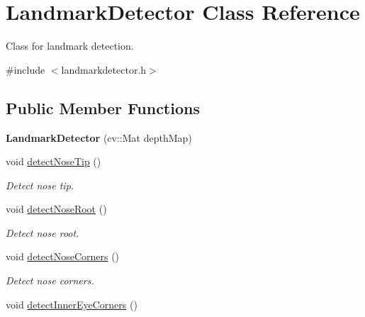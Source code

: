 \hypertarget{class_landmark_detector}{\section{Landmark\+Detector Class Reference}
\label{class_landmark_detector}
}


Class for landmark detection.  




{\ttfamily \#include $<$landmarkdetector.\+h$>$}

\subsection*{Public Member Functions}
\begin{DoxyCompactItemize}
\item 
\hypertarget{class_landmark_detector_ab1b5f48ca28480126aa72016e5f27456}{{\bfseries Landmark\+Detector} (cv\+::\+Mat depth\+Map)}\label{class_landmark_detector_ab1b5f48ca28480126aa72016e5f27456}

\item 
\hypertarget{class_landmark_detector_ab7d2787e5bff6190b282710f40a81467}{void \hyperlink{class_landmark_detector_ab7d2787e5bff6190b282710f40a81467}{detect\+Nose\+Tip} ()}\label{class_landmark_detector_ab7d2787e5bff6190b282710f40a81467}

\begin{DoxyCompactList}\small\item\em Detect nose tip. \end{DoxyCompactList}\item 
\hypertarget{class_landmark_detector_a197a7813b3f023433fb19c1928e173b0}{void \hyperlink{class_landmark_detector_a197a7813b3f023433fb19c1928e173b0}{detect\+Nose\+Root} ()}\label{class_landmark_detector_a197a7813b3f023433fb19c1928e173b0}

\begin{DoxyCompactList}\small\item\em Detect nose root. \end{DoxyCompactList}\item 
\hypertarget{class_landmark_detector_a842700d6ba9db23adf9f9308a45eb30d}{void \hyperlink{class_landmark_detector_a842700d6ba9db23adf9f9308a45eb30d}{detect\+Nose\+Corners} ()}\label{class_landmark_detector_a842700d6ba9db23adf9f9308a45eb30d}

\begin{DoxyCompactList}\small\item\em Detect nose corners. \end{DoxyCompactList}\item 
\hypertarget{class_landmark_detector_a5b4a55e448e6e6f5d0885a2f9d87bf2d}{void \hyperlink{class_landmark_detector_a5b4a55e448e6e6f5d0885a2f9d87bf2d}{detect\+Inner\+Eye\+Corners} ()}\label{class_landmark_detector_a5b4a55e448e6e6f5d0885a2f9d87bf2d}


\end{DoxyCompactItemize}
